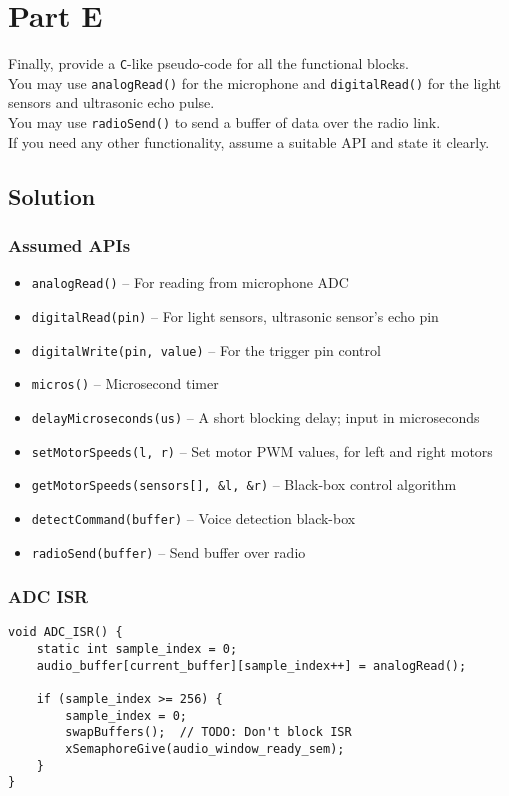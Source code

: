 \section*{Part E}

Finally, provide a \texttt{C}-like pseudo-code for all the functional blocks. \\
You may use \texttt{analogRead\@()} for the microphone and \texttt{digitalRead\@()} for the light sensors and ultrasonic echo pulse. \\
You may use \texttt{radioSend\@()} to send a buffer of data over the radio link. \\
If you need any other functionality, assume a suitable API and state it clearly.

\subsection*{Solution}

\subsubsection*{Assumed APIs}
\begin{itemize}[noitemsep, topsep=0pt]
    \item \texttt{analogRead\@()} – For reading from microphone ADC
    \item \texttt{digitalRead\@(pin)} – For light sensors, ultrasonic sensor's echo pin
    \item \texttt{digitalWrite\@(pin, value)} – For the trigger pin control
    \item \texttt{micros\@()} – Microsecond timer
    \item \texttt{delayMicroseconds\@(us)} – A short blocking delay; input in microseconds
    \item \texttt{setMotorSpeeds\@(l, r)} – Set motor PWM values, for left and right motors
    \item \texttt{getMotorSpeeds\@(sensors[], \&l, \&r)} – Black-box control algorithm
    \item \texttt{detectCommand\@(buffer)} – Voice detection black-box
    \item \texttt{radioSend\@(buffer)} – Send buffer over radio
\end{itemize}

\subsubsection*{ADC ISR}
\begin{verbatim}
void ADC_ISR() {
    static int sample_index = 0;
    audio_buffer[current_buffer][sample_index++] = analogRead();

    if (sample_index >= 256) {
        sample_index = 0;
        swapBuffers();  // TODO: Don't block ISR
        xSemaphoreGive(audio_window_ready_sem);
    }
}
\end{verbatim}

